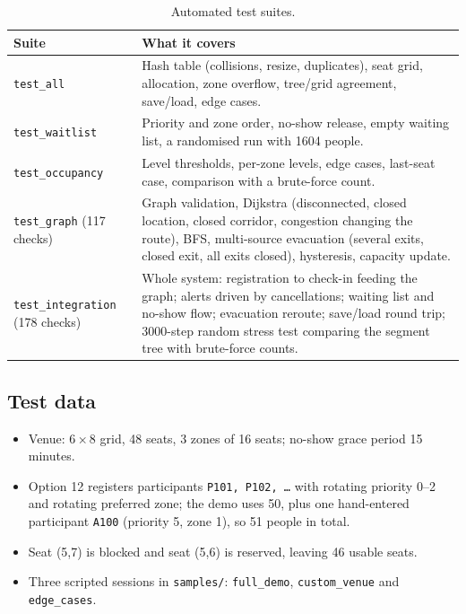 \documentclass[11pt,a4paper]{article}
\newcommand{\code}[1]{\texttt{#1}}
\begin{document}
\begin{table}[ht]
\centering
\small
\begin{tabularx}{\textwidth}{@{}l>{\raggedright\arraybackslash}X@{}}
\toprule
\textbf{Suite} & \textbf{What it covers}\\
\midrule
\code{test\_all} & Hash table (collisions, resize, duplicates), seat grid, allocation, zone overflow, tree/grid agreement, save/load, edge cases.\\
\code{test\_waitlist} & Priority and zone order, no-show release, empty waiting list, a randomised run with 1604 people.\\
\code{test\_occupancy} & Level thresholds, per-zone levels, edge cases, last-seat case, comparison with a brute-force count.\\
\code{test\_graph} (117 checks) & Graph validation, Dijkstra (disconnected, closed location, closed corridor, congestion changing the route), BFS, multi-source evacuation (several exits, closed exit, all exits closed), hysteresis, capacity update.\\
\code{test\_integration} (178 checks) & Whole system: registration to check-in feeding the graph; alerts driven by cancellations; waiting list and no-show flow; evacuation reroute; save/load round trip; 3000-step random stress test comparing the segment tree with brute-force counts.\\
\bottomrule
\end{tabularx}
\caption{Automated test suites.}
\end{table}

\subsection{Test data}
\begin{itemize}
  \item Venue: $6\times 8$ grid, 48 seats, 3 zones of 16 seats; no-show grace period 15 minutes.
  \item Option 12 registers participants \code{P101, P102, \dots} with rotating priority 0--2 and rotating preferred zone; the demo uses 50, plus one hand-entered participant \code{A100} (priority 5, zone 1), so 51 people in total.
  \item Seat (5,7) is blocked and seat (5,6) is reserved, leaving 46 usable seats.
  \item Three scripted sessions in \code{samples/}: \code{full\_demo}, \code{custom\_venue} and \code{edge\_cases}.
\end{itemize}
\end{document}
